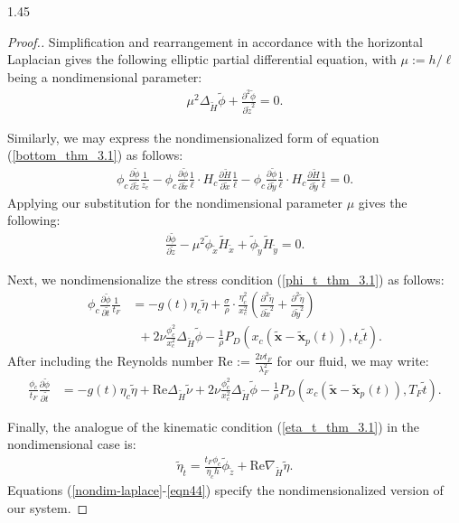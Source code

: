 \documentclass[12pt,titlepage]{article}
\theoremstyle{definition}
\theoremstyle{remark}
\newcommand{\ptl}{\partial}
\newcommand{\til}[1]{\widetilde{#1}}
\newcommand{\M}[1]{\mathbf{#1}}
\begin{document}
\begin{spacing}{1.45}
\begin{proof}[Proof.]
Simplification and rearrangement in accordance with the horizontal Laplacian gives the following elliptic partial differential equation, with $\mu := h/\ell$ being a nondimensional parameter:
\begin{align}
\label{nondim-laplace}
    \mu^2 \Delta_{\til{H}}{\til{\phi}} + \frac{\ptl^2 \til{\phi}}{\ptl \til{z}^2} = 0.
\end{align}

Similarly, we may express the nondimensionalized form of equation (\ref{bottom_thm_3.1}) as follows:
\begin{align*}
    \phi_c \frac{\ptl \til{\phi}}{\ptl \til{z}} \frac{1}{z_c} - \phi_c  \frac{\ptl \til{\phi}}{\ptl \til{x}} \frac{1}{\ell} \cdot H_c \frac{\ptl \til{H}}{\ptl \til{x}} \frac{1}{\ell}  - \phi_c  \frac{\ptl \til{\phi}}{\ptl \til{y}} \frac{1}{\ell} \cdot H_c \frac{\ptl \til{H}}{\ptl \til{y}} \frac{1}{\ell} = 0.
\end{align*}
Applying our substitution for the nondimensional parameter $\mu$ gives the following:
\begin{align}
\label{nondim-bottom}
    \frac{\ptl \til{\phi}}{\ptl \til{z}} - \mu^2{\til{\phi}_{\til{x}} \til{H}_{\til{x}} + \til{\phi}_{\til{y}} \til{H}_{\til{y}}} = 0.
\end{align}

Next, we nondimensionalize the stress condition (\ref{phi_t_thm_3.1}) as follows:
\begin{align*}
    \phi_c \frac{\ptl \til{\phi}}{\ptl \til{t}} \frac{1}{t_F} &= -g(t) \eta_{c} \til{\eta} + \frac{\sigma}{\rho} \cdot \frac{\eta_c^2}{x_c^2} \left( \frac{\ptl^2 \til{\eta}}{\ptl \til{x}^2} + \frac{\ptl^2 \til{\eta}}{\ptl \til{y}^2} \right) \\
    & \, \, \, + 2 \nu \frac{\phi_c^2}{x_c^2} \Delta_{\til{H}}{\til{\phi}} - \frac{1}{\rho} P_D(x_c ({\M{\til{x}}} - {\M{\til{x}}_p(t)}), t_c \til{t}).
\end{align*}
After including the Reynolds number Re := $\frac{2 \nu t_F}{\lambda_F^2}$ for our fluid, we may write:
\begin{align}
\label{eqn33}
    \frac{\phi_c}{t_F} \frac{\ptl \til{\phi}}{\ptl \til{t}} &= -g(t) \eta_{c} \til{\eta} + \mathrm{Re}  \Delta_{\til{H}}{\til{\nu}} + 2 \nu \frac{\phi_c^2}{x_c^2} \Delta_{\til{H}}{\til{\phi}} - \frac{1}{\rho} P_D(x_c ({\M{\til{x}}} - {\M{\til{x}}_p(t)}), T_F \til{t}).
\end{align}

Finally, the analogue of the kinematic condition (\ref{eta_t_thm_3.1}) in the nondimensional case is:
\begin{align}
\label{eqn44}
    \til{\eta}_{\til{t}} = \frac{t_F \phi_c}{\eta_c h} \til{\phi}_{\til{z}} + \mathrm{Re} \nabla_{\til{H}}{\til{\eta}}.
\end{align}
Equations (\ref{nondim-laplace}-\ref{eqn44}) specify the nondimensionalized version of our system.
\end{proof}



\end{spacing}
\end{document}
